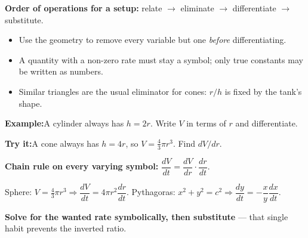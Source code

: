 \documentclass[12pt]{article}
\begin{document}


\begin{formulabox}
\textbf{Order of operations for a setup:} relate $\rightarrow$ eliminate $\rightarrow$ differentiate $\rightarrow$ substitute.
\begin{itemize}[leftmargin=0.8cm, itemsep=0pt, topsep=1pt]
  \item Use the geometry to remove every variable but one \emph{before} differentiating.
  \item A quantity with a non-zero rate must stay a symbol; only true constants may be written as numbers.
  \item Similar triangles are the usual eliminator for cones: $r/h$ is fixed by the tank's shape.
\end{itemize}
\end{formulabox}

\begin{examplebox}
\textbf{Example:}\quad A cylinder always has $h = 2r$. Write $V$ in terms of $r$ and differentiate.
\end{examplebox}

\begin{tryitbox}
\textbf{Try it:}\quad A cone always has $h = 4r$, so $V = \tfrac{4}{3}\pi r^3$. Find $dV/dr$.\\[2pt]
\end{tryitbox}


\begin{formulabox}
\textbf{Chain rule on every varying symbol:} $\dfrac{dV}{dt} = \dfrac{dV}{dr}\cdot\dfrac{dr}{dt}$.\par
Sphere: $V = \tfrac{4}{3}\pi r^3 \Rightarrow \dfrac{dV}{dt} = 4\pi r^2\dfrac{dr}{dt}$. \quad
Pythagoras: $x^2 + y^2 = c^2 \Rightarrow \dfrac{dy}{dt} = -\dfrac{x}{y}\dfrac{dx}{dt}$.\par
\textbf{Solve for the wanted rate symbolically, then substitute} --- that single habit prevents the inverted ratio.
\end{formulabox}
\end{document}

